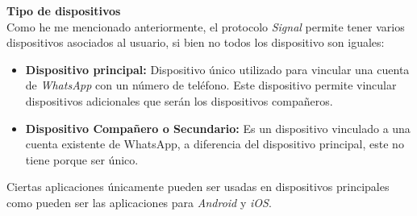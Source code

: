 \textbf{Tipo de dispositivos}\\
Como he me mencionado anteriormente, el protocolo \emph{Signal} permite tener varios dispositivos asociados al usuario, si bien no todos los dispositivo son iguales:
\begin{itemize}
	\item \textbf{Dispositivo principal:} Dispositivo único utilizado para vincular una cuenta de \emph{WhatsApp} con un número de teléfono. Este dispositivo permite vincular dispositivos adicionales que serán los dispositivos compañeros.
	\item \textbf{Dispositivo Compañero o Secundario:} Es un dispositivo vinculado a una cuenta existente de WhatsApp, a diferencia del dispositivo principal, este no tiene porque ser único.
\end{itemize}
Ciertas aplicaciones únicamente pueden ser usadas en dispositivos principales como pueden ser las aplicaciones para \emph{Android} y \emph{iOS}.

